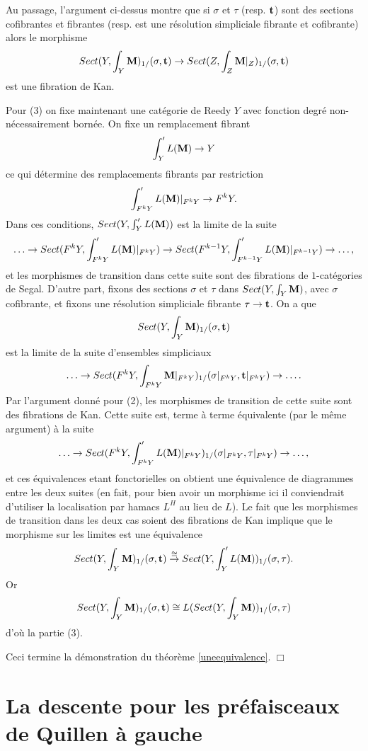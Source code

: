 \documentclass[12pt]{article}
\newcommand{\numero}[1]{\newpage\section{#1}}
\newcommand{\eop}{\hfill $\Box$\vspace{.1in}}
\newcommand{\mm}{{\bf M}}
\begin{document}
Au passage, l'argument ci-dessus montre que si $\sigma$ et $\tau$ (resp. ${\bf
t}$) sont des sections cofibrantes et fibrantes (resp.
est une r\'esolution simpliciale
fibrante et cofibrante) alors le morphisme
$$
Sect (Y, \int _Y\mm )_{1/}(\sigma , {\bf t} )\rightarrow
Sect (Z, \int _Z\mm |_Z)_{1/}(\sigma , {\bf t} )
$$
est une fibration de Kan.

Pour (3) on fixe maintenant une cat\'egorie de Reedy $Y$ avec fonction
degr\'e non-n\'ecessairement born\'ee. On fixe un remplacement fibrant
$$
\int '_YL(\mm )\rightarrow Y
$$
ce qui d\'etermine des remplacements fibrants par restriction
$$
\int '_{F^kY} L(\mm )|_{F^kY}\rightarrow F^kY.
$$
Dans ces conditions, $Sect (Y, \int '_YL(\mm ))$ est la limite de la suite
$$
\ldots \rightarrow Sect (F^kY, \int '_{F^kY}L(\mm )|_{F^kY})
\rightarrow Sect (F^{k-1}Y, \int '_{F^{k-1}Y}L(\mm
)|_{F^{k-1}Y})\rightarrow \ldots ,
$$
et les morphismes de transition dans cette suite sont des fibrations
de $1$-cat\'egories de Segal. D'autre part, fixons des sections $\sigma$ et
$\tau$ dans $Sect (Y, \int _Y\mm )$, avec $\sigma$ cofibrante, et fixons une
r\'esolution simpliciale fibrante $\tau \rightarrow {\bf t}$. On a que
$$
Sect (Y, \int _Y\mm )_{1/}(\sigma , {\bf t})
$$
est la limite de la suite d'ensembles simpliciaux
$$
\ldots \rightarrow Sect (F^kY, \int _{F^kY}\mm |_{F^kY})_{1/}(\sigma
|_{F^kY}, {\bf t}|_{F^kY})
\rightarrow \ldots .
$$
Par l'argument donn\'e pour (2), les morphismes de transition
de cette suite sont des
fibrations de Kan. Cette suite est, terme \`a terme \'equivalente
(par le m\^eme argument) \`a la suite
$$
\ldots \rightarrow Sect (F^kY, \int '_{F^kY}L(\mm )|_{F^kY})_{1/}(\sigma
|_{F^kY}, \tau |_{F^kY}
) \rightarrow \ldots ,
$$
et ces \'equivalences etant fonctorielles on obtient une \'equivalence
de diagrammes entre les deux suites (en fait, pour bien avoir un morphisme ici
il conviendrait d'utiliser la localisation par hamacs $L^H$ au lieu de $L$). Le
fait que les morphismes de transition dans les deux cas soient des fibrations de
Kan implique que le morphisme sur les limites est une \'equivalence
$$
Sect (Y, \int _Y\mm )_{1/}(\sigma , {\bf t})\stackrel{\cong}{\rightarrow}
Sect (Y, \int '_YL(\mm ))_{1/}(\sigma , \tau ).
$$
Or
$$
Sect (Y, \int _Y\mm )_{1/}(\sigma , {\bf t}) \cong
L(Sect (Y, \int _Y\mm ))_{1/}(\sigma , \tau )
$$
d'o\`u la partie (3).

Ceci termine la d\'emonstration du th\'eor\`eme \ref{uneequivalence}.
\eop




\numero{La descente pour les pr\'efaisceaux de Quillen \`a gauche}
\end{document}
